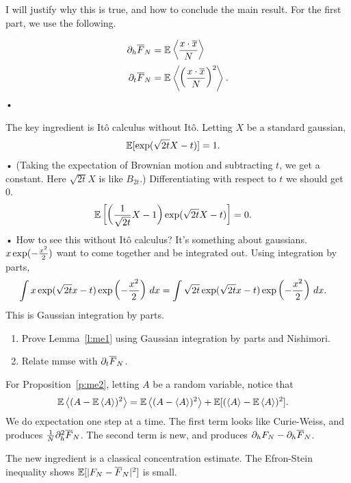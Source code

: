 I will justify why this is true, and how to conclude the main result.
For the first part, we use the following.
\begin{lem}\label{l:me1}
\begin{align*}
\partial_h \overline{F}_N &= \mathbb{E}\left\langle {\frac{x\cdot \overline{x}}{N}}\right\rangle\\
\partial_t \overline{F}_N &= \mathbb{E}\left\langle {\left( {\frac{x\cdot\overline{x}}{N}} \right)^2}\right\rangle.
\end{align*}•
\end{lem}

The key ingredient is It\^o calculus without It\^o. 
Letting $X$ be a standard gaussian, 
\begin{align*}
\mathbb{E}[\exp(\sqrt{2t}X-t)]&=1.
\end{align*}•
(Taking the expectation of Brownian motion and subtracting $t$, we get a constant. Here $\sqrt{2t}X$ is like $B_{2t}$.)
Differentiating with respect to $t$ we should get 0.
\begin{align*}
\mathbb{E}\left[ {
\left( {
\frac{1}{\sqrt{2t}}X-1
} \right)\exp(\sqrt{2t}X-t)
} \right]&=0.
\end{align*}•
How to see this without It\^o calculus? It's something about gaussians. $x\exp(-\frac{x^2}{2})$ want to come together and be integrated out. %
Using integration by parts,
\begin{align*}
\int x \exp(\sqrt{2t}x-t) \exp\left( {-\frac{x^2}{2}} \right)\,dx
&= \int \sqrt{2t}\exp(\sqrt{2t}x-t) \exp\left( {-\frac{x^2}{2}} \right)\,dx.
\end{align*}
This is Gaussian integration by parts.
\begin{exr}
\begin{enumerate}
\item
Prove Lemma~\ref{l:me1} using Gaussian integration by parts and Nishimori.
\item
Relate mmse with $\partial_t \overline{F}_N$.
\end{enumerate}
\end{exr}
For Proposition~\ref{p:me2}, letting $A$ be a random variable, notice that 
\begin{align*}
\mathbb{E}\left\langle {(A-\mathbb{E}\left\langle {A}\right\rangle)^2}\right\rangle
&= \mathbb{E}\left\langle {(A-\left\langle {A}\right\rangle)^2}\right\rangle 
+ \mathbb{E}[(\left\langle {A}\right\rangle-\mathbb{E}\left\langle {A}\right\rangle)^2].
\end{align*}
We do expectation one step at a time.
The first term looks like Curie-Weiss, and produces $\frac{1}{N} \partial_h^2 \overline{F}_N$. The second term is new, and produces $\partial_h F_N - \partial_h\overline{F}_N$.

The new ingredient is a classical concentration estimate. The Efron-Stein %
inequality shows $\mathbb{E}[|F_N-\overline{F}_N|^2]$ is small.

